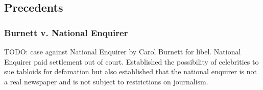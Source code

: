 %
%
\subsection{Precedents}

\subsubsection{Burnett v. National Enquirer}

\par TODO: case against National Enquirer by Carol Burnett for libel. National Enquirer paid settlement out of court. Established the possibility of celebrities to sue tabloids for defamation but also established that the national enquirer is not a real newspaper and is not subject to restrictions on journalism.
\cite{burnett_v_ne}
